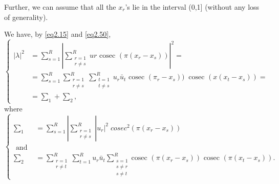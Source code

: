 Further, we can assume that all the $x_r$'s lie in the interval
(0,1] (without any loss of generality). 

We have, by \eqref{eq2.15} and \eqref{eq2.50},
\begin{equation*}
\begin{cases}
|\lambda |^2 &= \sum\limits_{s=1}^{R} |\sum\limits^R_{\substack{r=1
    \\ r \neq s}} ur  \text{ cosec } (\pi (x_r-x_s))|^2=\\ 
&= \sum\limits_{s=1}^{R} \sum\limits^R_{\substack{r=1 \\ r \neq s}}
\sum\limits^R_{\substack{t=1 \\ t \neq s}} u_r \bar{u}_t \text{ cosec } (\pi_r
-x_s )) ~ \text{ cosec } (x(x_t- x_s)) =\\ 
&= \sum_1 +\sum_2 ,
\end{cases} \tag{2.53}\label{eq2.53}
\end{equation*} 
where
\begin{equation*}
\begin{cases}
\sum_1  &= \sum\limits_{s=1}^{R} |\sum\limits^R_{\substack{r=1 \\ r
    \neq s}} | u_r|^2 \; cosec^2 (\pi( x_r-x_s ))\\ 
\text{ and } &\\
\sum_2 &= \sum\limits_{\substack{r=1 \\ r \neq t}}^{R} \sum\limits_{t=1}^{R} u_r
\bar{u}_t \sum\limits_{\substack{s = 1 \\ s \neq r \\ s \neq t}}^{R} \text{
  cosec } (\pi( x_r-x_s )) \text{ cosec } (\pi ( x_t-x_s )). 
\end{cases} \tag{2.54}\label{eq2.54}
\end{equation*}

